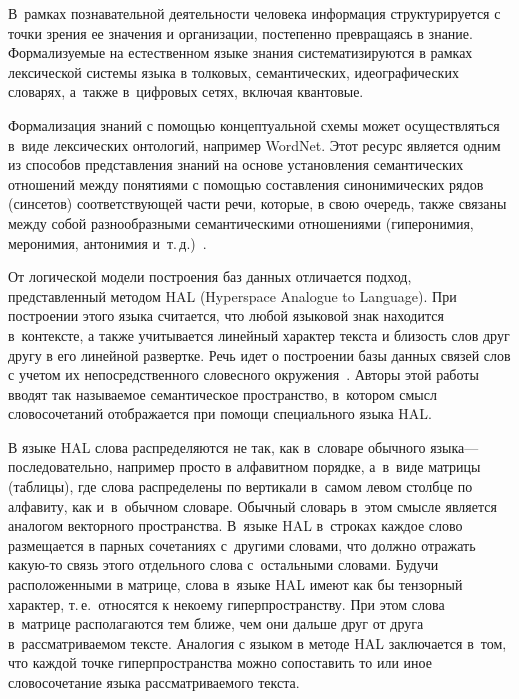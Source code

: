 
  
\vspace*{-4pt}



\thispagestyle{headings}

\begin{multicols}{2}

\label{st\stat}
     
    В~рамках познавательной дея\-тель\-ности человека информация 
структурируется с точ\-ки зрения ее значения и организации, постепенно 
пре\-вра\-ща\-ясь в знание. Фор\-ма\-ли\-зу\-емые на естественном языке знания 
систематизируются в рамках лексической сис\-те\-мы языка в толковых, 
семантических, идеографических словарях, а~так\-же в~циф\-ро\-вых сетях, 
вклю\-чая квантовые.
    
    Формализация знаний с по\-мощью концептуальной схемы может 
осуществляться в~виде лексических онтологий, например WordNet. Этот 
ресурс является одним из способов пред\-став\-ле\-ния знаний на основе 
установления семантических отношений меж\-ду понятиями с по\-мощью 
составления синонимических рядов (синсетов) со\-от\-вет\-ст\-ву\-ющей час\-ти речи, 
которые, в свою очередь, так\-же связаны меж\-ду собой разнообразными 
семантическими отношениями (гиперонимия, меронимия, антонимия 
и~т.\,д.)~\cite{4-an}.
    
    От логической модели построения баз данных отличается подход, 
представленный методом HAL (Hyperspace Analogue to Language). При 
построении этого языка считается, что любой языковой знак находится 
в~контексте, а также учитывается линейный характер текста и бли\-зость слов 
друг другу в его линейной развертке. Речь идет о построении базы данных 
связей слов с учетом их непосредственного словесного окружения~\cite{5-an}. 
Авторы этой работы вводят так называемое семантическое пространство, 
в~котором смысл словосочетаний отображается при помощи специального 
языка HAL.
    
    В языке HAL слова распределяются не так, как в~словаре обычного языка--- 
последовательно, например просто в алфавитном порядке, а~в~виде\linebreak  
мат\-ри\-цы (таблицы), где слова распределены по вертикали в~самом левом 
столб\-це по алфавиту, как и~в~обычном словаре. Обычный словарь в~этом 
смыс\-ле является аналогом векторного пространства. В~языке HAL в~строках 
каждое слово размещается в пар\-ных сочетаниях с~другими словами, что должно 
отражать ка\-кую-то связь этого отдельного слова с~остальными словами. Будучи 
расположенными в мат\-ри\-це, слова в~языке HAL имеют как бы тензорный 
характер, т.\,е.\ относятся к некоему гиперпространству. При этом слова 
в~мат\-ри\-це располагаются тем ближе, чем они дальше друг от друга  
в~рас\-смат\-ри\-ва\-емом текс\-те. Аналогия с языком в методе HAL заключается 
в~том, что каж\-дой точке гиперпространства можно сопоставить то или иное 
словосочетание языка рас\-смат\-ри\-ва\-емо\-го текста.
    

\end{multicols}
